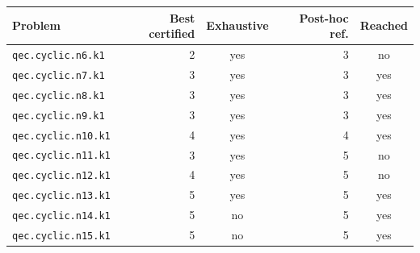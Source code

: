 \begin{tabular}{lrcrc}
\toprule
Problem & Best certified & Exhaustive & Post-hoc ref. & Reached\\
\midrule
\texttt{qec.cyclic.n6.k1} & 2 & yes & 3 & no\\
\texttt{qec.cyclic.n7.k1} & 3 & yes & 3 & yes\\
\texttt{qec.cyclic.n8.k1} & 3 & yes & 3 & yes\\
\texttt{qec.cyclic.n9.k1} & 3 & yes & 3 & yes\\
\texttt{qec.cyclic.n10.k1} & 4 & yes & 4 & yes\\
\texttt{qec.cyclic.n11.k1} & 3 & yes & 5 & no\\
\texttt{qec.cyclic.n12.k1} & 4 & yes & 5 & no\\
\texttt{qec.cyclic.n13.k1} & 5 & yes & 5 & yes\\
\texttt{qec.cyclic.n14.k1} & 5 & no & 5 & yes\\
\texttt{qec.cyclic.n15.k1} & 5 & no & 5 & yes\\
\bottomrule
\end{tabular}
